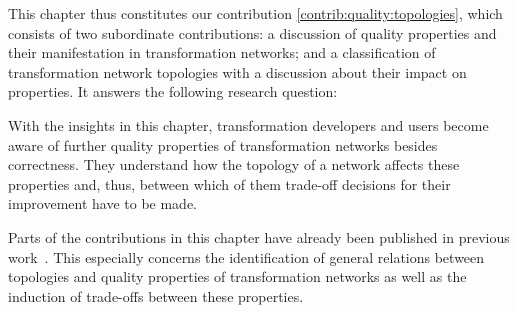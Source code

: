 This chapter thus constitutes our contribution \autoref{contrib:quality:topologies}, which consists of two subordinate contributions: a discussion of quality properties and their manifestation in transformation networks; and a classification of transformation network topologies with a discussion about their impact on properties.
It answers the following research question:


With the insights in this chapter, transformation developers and users become aware of further quality properties of transformation networks besides correctness.
They understand how the topology of a network affects these properties and, thus, between which of them trade-off decisions for their improvement have to be made.

Parts of the contributions in this chapter have already been published in previous work~\cite{klare2018docsym}.
This especially concerns the identification of general relations between topologies and quality properties of transformation networks as well as the induction of trade-offs between these properties.





